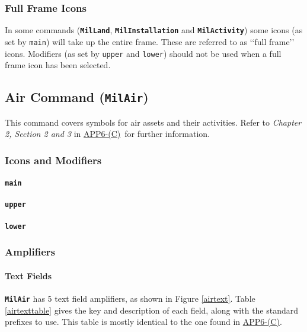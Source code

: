 \documentclass[a4paper, titlepage]{article}
\newcommand\DocLink{\href{https://www.awl.edu.pl/images/en/APP_6_C.pdf}{APP6-(C)}}
\begin{document}
\subsubsection{Full Frame Icons}

In some commands (\textbf{\texttt{MilLand}}, \textbf{\texttt{MilInstallation}} and \textbf{\texttt{MilActivity}}) some icons (as set by \texttt{main}) will take up the entire frame. These are referred to as \lq\lq{}full frame\rq\rq{} icons. Modifiers (as set by \texttt{upper} and \texttt{lower}) should not be used when a full frame icon has been selected.

\subsection{Air Command (\textbf{\texttt{MilAir}})}

This command covers symbols for air assets and their activities. Refer to \textit{Chapter 2, Section 2 and 3} in \DocLink\ for further information.

\subsubsection{Icons and Modifiers}

\paragraph{\texttt{main}}\quad
%

\paragraph{\texttt{upper}}\quad
%

\paragraph{\texttt{lower}}\quad 
%

\subsubsection{Amplifiers}

\paragraph{Text Fields}

\textbf{\texttt{MilAir}} has 5 text field amplifiers, as shown in Figure \ref{airtext}. Table \ref{airtexttable} gives the key and description of each field, along with the standard prefixes to use. This table is mostly identical to the one found in \DocLink.
\end{document}
